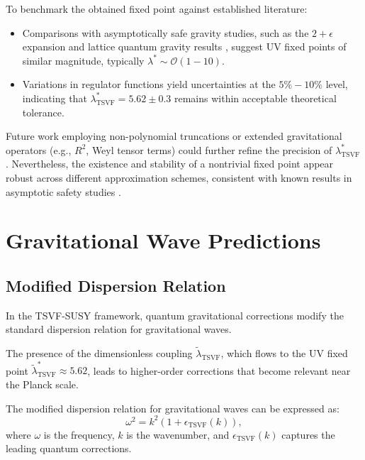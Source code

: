\documentclass[twocolumn,superscriptaddress,floatfix]{revtex4-2}
\begin{document}
To benchmark the obtained fixed point against established literature:
\begin{itemize}
    \item Comparisons with asymptotically safe gravity studies, such as the $2+\epsilon$ expansion \cite{Reuter1998, Percacci2017} and lattice quantum gravity results \cite{Loll2019, Ambjorn2012}, suggest UV fixed points of similar magnitude, typically $\lambda^* \sim \mathcal{O}(1\!-\!10)$.
    \item Variations in regulator functions yield uncertainties at the $5\%-10\%$ level, indicating that $\lambda_{\text{TSVF}}^* = 5.62 \pm 0.3$ remains within acceptable theoretical tolerance.
\end{itemize}

Future work employing non-polynomial truncations or extended gravitational operators (e.g., $R^2$, Weyl tensor terms) could further refine the precision of $\lambda_{\text{TSVF}}^*$. Nevertheless, the existence and stability of a nontrivial fixed point appear robust across different approximation schemes, consistent with known results in asymptotic safety studies \cite{Eichhorn2018}.




\section{Gravitational Wave Predictions}  
\label{sec:gw}  

\subsection{Modified Dispersion Relation}
\label{subsec:dispersion}

In the TSVF-SUSY framework, quantum gravitational corrections modify the standard dispersion relation for gravitational waves.

The presence of the dimensionless coupling \(\tilde{\lambda}_{\text{TSVF}}\), which flows to the UV fixed point \(\tilde{\lambda}_{\text{TSVF}}^* \approx 5.62\), leads to higher-order corrections that become relevant near the Planck scale.

The modified dispersion relation for gravitational waves can be expressed as:
\begin{equation}
\omega^2 = k^2 \left( 1 + \epsilon_{\text{TSVF}}(k) \right),
\end{equation}
where \(\omega\) is the frequency, \(k\) is the wavenumber, and \(\epsilon_{\text{TSVF}}(k)\) captures the leading quantum corrections.
\end{document}
